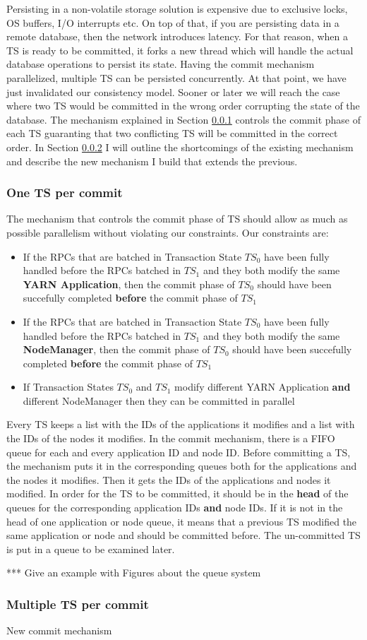 Persisting in a non-volatile storage solution is expensive due to
exclusive locks, OS buffers, I/O interrupts etc. On top of that, if you are
persisting data in a remote database, then the network introduces
latency. For that reason, when a TS is ready to be committed, it forks
a new thread which will handle the actual database operations to
persist its state. Having the commit mechanism parallelized, multiple
TS can be persisted concurrently. At that point, we have just
invalidated our consistency model. Sooner or later we will
reach the case where two TS would be committed in the wrong order
corrupting the state of the database. The mechanism explained in
Section \ref{sssec:impl_aggr_old} controls the commit phase of each TS
guaranting that two conflicting TS will be committed in the correct
order. In Section \ref{sssec:impl_aggr_new} I will outline the
shortcomings of the existing mechanism and describe the new mechanism
I build that extends the previous.

\subsubsection{One TS per commit}
\label{sssec:impl_aggr_old}
The mechanism that controls the commit phase of TS should allow as
much as possible parallelism without violating our constraints. Our
constraints are:
\begin{itemize}
\item If the RPCs that are batched in Transaction State $TS_0$ have
  been fully handled before the RPCs batched in $TS_1$ and they both
  modify the same \textbf{YARN Application}, then the commit phase of $TS_0$
  should have been succefully completed \textbf{before} the commit
  phase of $TS_1$

\item If the RPCs that are batched in Transaction State $TS_0$ have
  been fully handled before the RPCs batched in $TS_1$ and they both
  modify the same \textbf{NodeManager}, then the commit phase of $TS_0$
  should have been succefully completed \textbf{before} the commit
  phase of $TS_1$

\item If Transaction States $TS_0$ and $TS_1$ modify different YARN
  Application \textbf{and} different NodeManager then they can be committed in parallel
\end{itemize}

Every TS keeps a list with the IDs of the applications it modifies and
a list with the IDs of the nodes it modifies. In the commit mechanism,
there is a FIFO queue for each and every application ID and node
ID. Before committing a TS, the mechanism puts it in the corresponding
queues both for the applications and the nodes it modifies. Then it
gets the IDs of the applications and nodes it modified. In order for
the TS to be committed, it should be in the \textbf{head} of the
queues for the corresponding application IDs \textbf{and} node IDs. If
it is not in the head of one application or node queue, it means that
a previous TS modified the same application or node and should be
committed before. The un-committed TS is put in a queue to be
examined later.


*** Give an example with Figures about the queue system

\subsubsection{Multiple TS per commit}
\label{sssec:impl_aggr_new}
New commit mechanism